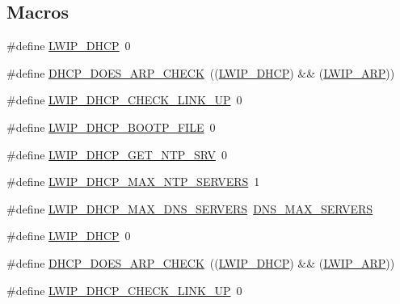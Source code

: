 \subsection*{Macros}
\begin{DoxyCompactItemize}
\item 
\#define \hyperlink{group__lwip__opts__dhcp_ga8a6ec62dc121064ac591b1fd8567bee9}{L\+W\+I\+P\+\_\+\+D\+H\+CP}~0
\item 
\#define \hyperlink{group__lwip__opts__dhcp_gab2d91de7b2fce879b0a213682e1b0b69}{D\+H\+C\+P\+\_\+\+D\+O\+E\+S\+\_\+\+A\+R\+P\+\_\+\+C\+H\+E\+CK}~((\hyperlink{openmote-cc2538_2lwip_2test_2unit_2lwipopts_8h_a8a6ec62dc121064ac591b1fd8567bee9}{L\+W\+I\+P\+\_\+\+D\+H\+CP}) \&\& (\hyperlink{group__lwip__opts__arp_ga9609a014bba4638cc191d6a8f9556c87}{L\+W\+I\+P\+\_\+\+A\+RP}))
\item 
\#define \hyperlink{group__lwip__opts__dhcp_ga1e9ec404a96581fdbc9d231a8a698a60}{L\+W\+I\+P\+\_\+\+D\+H\+C\+P\+\_\+\+C\+H\+E\+C\+K\+\_\+\+L\+I\+N\+K\+\_\+\+UP}~0
\item 
\#define \hyperlink{group__lwip__opts__dhcp_ga3c2983cbd228011dd3e18cb417e7e423}{L\+W\+I\+P\+\_\+\+D\+H\+C\+P\+\_\+\+B\+O\+O\+T\+P\+\_\+\+F\+I\+LE}~0
\item 
\#define \hyperlink{group__lwip__opts__dhcp_ga2cc18315edcd5ffc083d1256f7d22a83}{L\+W\+I\+P\+\_\+\+D\+H\+C\+P\+\_\+\+G\+E\+T\+\_\+\+N\+T\+P\+\_\+\+S\+RV}~0
\item 
\#define \hyperlink{group__lwip__opts__dhcp_ga9d014e3f7dc9e1e7c7decd8652ba65e2}{L\+W\+I\+P\+\_\+\+D\+H\+C\+P\+\_\+\+M\+A\+X\+\_\+\+N\+T\+P\+\_\+\+S\+E\+R\+V\+E\+RS}~1
\item 
\#define \hyperlink{group__lwip__opts__dhcp_ga60ccc20fbb08be24b5d5f599dd47a6a6}{L\+W\+I\+P\+\_\+\+D\+H\+C\+P\+\_\+\+M\+A\+X\+\_\+\+D\+N\+S\+\_\+\+S\+E\+R\+V\+E\+RS}~\hyperlink{group__lwip__opts__dns_ga9f9881c887a8aceb9765820c2dbdf292}{D\+N\+S\+\_\+\+M\+A\+X\+\_\+\+S\+E\+R\+V\+E\+RS}
\item 
\#define \hyperlink{group__lwip__opts__dhcp_ga8a6ec62dc121064ac591b1fd8567bee9}{L\+W\+I\+P\+\_\+\+D\+H\+CP}~0
\item 
\#define \hyperlink{group__lwip__opts__dhcp_gab2d91de7b2fce879b0a213682e1b0b69}{D\+H\+C\+P\+\_\+\+D\+O\+E\+S\+\_\+\+A\+R\+P\+\_\+\+C\+H\+E\+CK}~((\hyperlink{openmote-cc2538_2lwip_2test_2unit_2lwipopts_8h_a8a6ec62dc121064ac591b1fd8567bee9}{L\+W\+I\+P\+\_\+\+D\+H\+CP}) \&\& (\hyperlink{group__lwip__opts__arp_ga9609a014bba4638cc191d6a8f9556c87}{L\+W\+I\+P\+\_\+\+A\+RP}))
\item 
\#define \hyperlink{group__lwip__opts__dhcp_ga1e9ec404a96581fdbc9d231a8a698a60}{L\+W\+I\+P\+\_\+\+D\+H\+C\+P\+\_\+\+C\+H\+E\+C\+K\+\_\+\+L\+I\+N\+K\+\_\+\+UP}~0

\end{DoxyCompactItemize}
